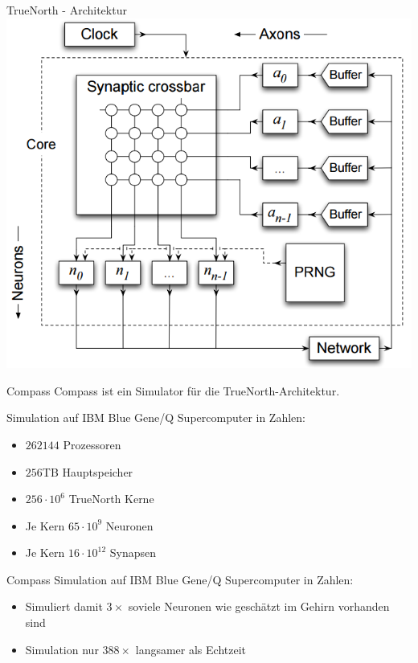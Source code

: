 \begin{slide}{TrueNorth - Architektur}
	\includegraphics[width=\textwidth,height=0.8\textheight,keepaspectratio]{content/TrueNorthArchitecture.PNG}
\end{slide}

\begin{slide}{Compass}
	Compass ist ein Simulator für die TrueNorth-Architektur.
	
	Simulation auf IBM Blue Gene/Q Supercomputer in Zahlen:
	\begin{itemize}
		\item $262144$ Prozessoren
		\item $256$TB Hauptspeicher
		\item $256 \cdot 10^6$ TrueNorth Kerne
		\item Je Kern $65 \cdot 10^9$ Neuronen
    \item Je Kern $16 \cdot 10^{12}$ Synapsen
	\end{itemize}
\end{slide}

\begin{slide}{Compass}	
	Simulation auf IBM Blue Gene/Q Supercomputer in Zahlen:
	\begin{itemize}
		\item Simuliert damit $3\times$ soviele Neuronen wie geschätzt im Gehirn vorhanden sind
		\item Simulation nur $388\times$ langsamer als Echtzeit
	\end{itemize}
\end{slide}

